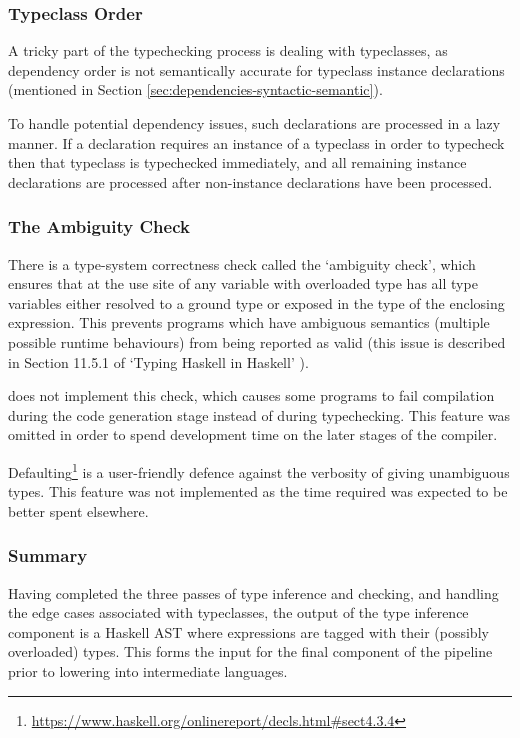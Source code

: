 \documentclass[dissertation.tex]{subfiles}
\begin{document}
{{        \subsubsection*{Typeclass Order}\label{sec:typeclass-order}
        {
            A tricky part of the typechecking process is dealing with typeclasses, as dependency order is not semantically accurate for typeclass instance declarations (mentioned in Section \ref{sec:dependencies-syntactic-semantic}).
            
            To handle potential dependency issues, such declarations are processed in a lazy manner. If a declaration requires an instance of a typeclass in order to typecheck then that typeclass is typechecked immediately, and all remaining instance declarations are processed after non-instance declarations have been processed.
        }
        \subsubsection*{The Ambiguity Check}
        {
            There is a type-system correctness check called the `ambiguity check', which ensures that at the use site of any variable with overloaded type has all type variables either resolved to a ground type or exposed in the type of the enclosing expression. This prevents programs which have ambiguous semantics (multiple possible runtime behaviours) from being reported as valid (this issue is described in Section 11.5.1 of `Typing Haskell in Haskell' \cite{THIH}). 

            \compilername does not implement this check, which causes some programs to fail compilation during the code generation stage instead of during typechecking. This feature was omitted in order to spend development time on the later stages of the compiler.

            Defaulting\footnote{\url{https://www.haskell.org/onlinereport/decls.html\#sect4.3.4}} is a user-friendly defence against the verbosity of giving unambiguous types. This feature was not implemented as the time required was expected to be better spent elsewhere.
        }
        \subsubsection*{Summary}
        {
            Having completed the three passes of type inference and checking, and handling the edge cases associated with typeclasses, the output of the type inference component is a Haskell AST where expressions are tagged with their (possibly overloaded) types. This forms the input for the final component of the pipeline prior to lowering into intermediate languages.   
        }
    }
}
\end{document}
